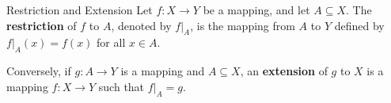 \begin{definition}{Restriction and Extension} %
    Let \(f: X \to Y\) be a mapping, and let \(A \subseteq X\).
    The \textbf{restriction} of \(f\) to \(A\), denoted by \(f|_A\), 
    is the mapping from \(A\) to \(Y\) defined by \(f|_A(x) = f(x)\) for all \(x \in A\).

    Conversely, if \(g: A \to Y\) is a mapping and \(A \subseteq X\),
    an \textbf{extension} of \(g\) to \(X\) is a mapping \(f: X \to Y\) such that \(f|_A = g\).
\end{definition}



